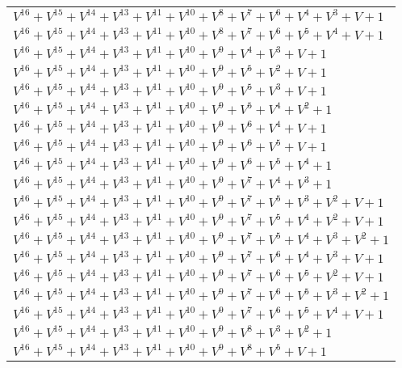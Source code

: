 \documentclass[12pt]{article}
\begin{document}
\begin{adjustwidth}{-4cm}{}
\begin{center}
\begin{longtable}{|l|}
$V^{16}  +V^{15}  +V^{14}  +V^{13}  +V^{11}  +V^{10}  +V^{8}  +V^{7}  +V^{6}  +V^{4}  +V^{3}  + V + 1$ \\
$V^{16}  +V^{15}  +V^{14}  +V^{13}  +V^{11}  +V^{10}  +V^{8}  +V^{7}  +V^{6}  +V^{5}  +V^{4}  + V + 1$ \\
$V^{16}  +V^{15}  +V^{14}  +V^{13}  +V^{11}  +V^{10}  +V^{9}  +V^{4}  +V^{3}  + V + 1$ \\
$V^{16}  +V^{15}  +V^{14}  +V^{13}  +V^{11}  +V^{10}  +V^{9}  +V^{5}  +V^{2}  + V + 1$ \\
$V^{16}  +V^{15}  +V^{14}  +V^{13}  +V^{11}  +V^{10}  +V^{9}  +V^{5}  +V^{3}  + V + 1$ \\
$V^{16}  +V^{15}  +V^{14}  +V^{13}  +V^{11}  +V^{10}  +V^{9}  +V^{5}  +V^{4}  +V^{2}  + 1$ \\
$V^{16}  +V^{15}  +V^{14}  +V^{13}  +V^{11}  +V^{10}  +V^{9}  +V^{6}  +V^{4}  + V + 1$ \\
$V^{16}  +V^{15}  +V^{14}  +V^{13}  +V^{11}  +V^{10}  +V^{9}  +V^{6}  +V^{5}  + V + 1$ \\
$V^{16}  +V^{15}  +V^{14}  +V^{13}  +V^{11}  +V^{10}  +V^{9}  +V^{6}  +V^{5}  +V^{4}  + 1$ \\
$V^{16}  +V^{15}  +V^{14}  +V^{13}  +V^{11}  +V^{10}  +V^{9}  +V^{7}  +V^{4}  +V^{3}  + 1$ \\
$V^{16}  +V^{15}  +V^{14}  +V^{13}  +V^{11}  +V^{10}  +V^{9}  +V^{7}  +V^{5}  +V^{3}  +V^{2}  + V + 1$ \\
$V^{16}  +V^{15}  +V^{14}  +V^{13}  +V^{11}  +V^{10}  +V^{9}  +V^{7}  +V^{5}  +V^{4}  +V^{2}  + V + 1$ \\
$V^{16}  +V^{15}  +V^{14}  +V^{13}  +V^{11}  +V^{10}  +V^{9}  +V^{7}  +V^{5}  +V^{4}  +V^{3}  +V^{2}  + 1$ \\
$V^{16}  +V^{15}  +V^{14}  +V^{13}  +V^{11}  +V^{10}  +V^{9}  +V^{7}  +V^{6}  +V^{4}  +V^{3}  + V + 1$ \\
$V^{16}  +V^{15}  +V^{14}  +V^{13}  +V^{11}  +V^{10}  +V^{9}  +V^{7}  +V^{6}  +V^{5}  +V^{2}  + V + 1$ \\
$V^{16}  +V^{15}  +V^{14}  +V^{13}  +V^{11}  +V^{10}  +V^{9}  +V^{7}  +V^{6}  +V^{5}  +V^{3}  +V^{2}  + 1$ \\
$V^{16}  +V^{15}  +V^{14}  +V^{13}  +V^{11}  +V^{10}  +V^{9}  +V^{7}  +V^{6}  +V^{5}  +V^{4}  + V + 1$ \\
$V^{16}  +V^{15}  +V^{14}  +V^{13}  +V^{11}  +V^{10}  +V^{9}  +V^{8}  +V^{3}  +V^{2}  + 1$ \\
$V^{16}  +V^{15}  +V^{14}  +V^{13}  +V^{11}  +V^{10}  +V^{9}  +V^{8}  +V^{5}  + V + 1$ \\

\end{longtable}
\end{center}
\end{adjustwidth}
\end{document}
